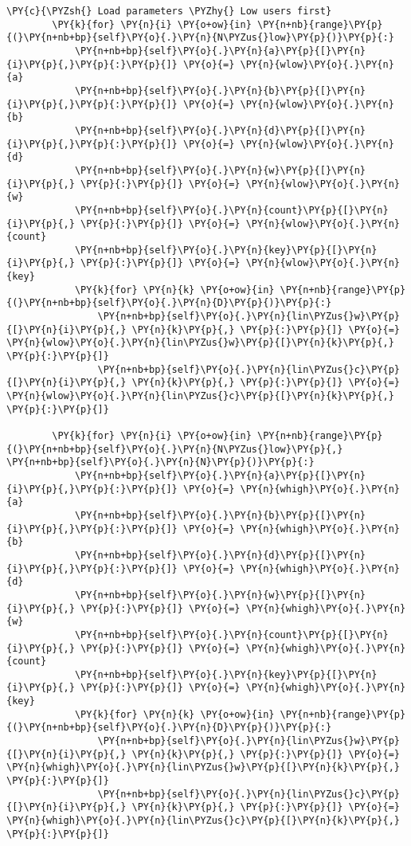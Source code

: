 \begin{Verbatim}[commandchars=\\\{\}]
        \PY{c}{\PYZsh{} Load parameters \PYZhy{} Low users first}
        \PY{k}{for} \PY{n}{i} \PY{o+ow}{in} \PY{n+nb}{range}\PY{p}{(}\PY{n+nb+bp}{self}\PY{o}{.}\PY{n}{N\PYZus{}low}\PY{p}{)}\PY{p}{:}
            \PY{n+nb+bp}{self}\PY{o}{.}\PY{n}{a}\PY{p}{[}\PY{n}{i}\PY{p}{,}\PY{p}{:}\PY{p}{]} \PY{o}{=} \PY{n}{wlow}\PY{o}{.}\PY{n}{a}
            \PY{n+nb+bp}{self}\PY{o}{.}\PY{n}{b}\PY{p}{[}\PY{n}{i}\PY{p}{,}\PY{p}{:}\PY{p}{]} \PY{o}{=} \PY{n}{wlow}\PY{o}{.}\PY{n}{b}
            \PY{n+nb+bp}{self}\PY{o}{.}\PY{n}{d}\PY{p}{[}\PY{n}{i}\PY{p}{,}\PY{p}{:}\PY{p}{]} \PY{o}{=} \PY{n}{wlow}\PY{o}{.}\PY{n}{d}
            \PY{n+nb+bp}{self}\PY{o}{.}\PY{n}{w}\PY{p}{[}\PY{n}{i}\PY{p}{,} \PY{p}{:}\PY{p}{]} \PY{o}{=} \PY{n}{wlow}\PY{o}{.}\PY{n}{w}
            \PY{n+nb+bp}{self}\PY{o}{.}\PY{n}{count}\PY{p}{[}\PY{n}{i}\PY{p}{,} \PY{p}{:}\PY{p}{]} \PY{o}{=} \PY{n}{wlow}\PY{o}{.}\PY{n}{count}
            \PY{n+nb+bp}{self}\PY{o}{.}\PY{n}{key}\PY{p}{[}\PY{n}{i}\PY{p}{,} \PY{p}{:}\PY{p}{]} \PY{o}{=} \PY{n}{wlow}\PY{o}{.}\PY{n}{key}
            \PY{k}{for} \PY{n}{k} \PY{o+ow}{in} \PY{n+nb}{range}\PY{p}{(}\PY{n+nb+bp}{self}\PY{o}{.}\PY{n}{D}\PY{p}{)}\PY{p}{:}
                \PY{n+nb+bp}{self}\PY{o}{.}\PY{n}{lin\PYZus{}w}\PY{p}{[}\PY{n}{i}\PY{p}{,} \PY{n}{k}\PY{p}{,} \PY{p}{:}\PY{p}{]} \PY{o}{=} \PY{n}{wlow}\PY{o}{.}\PY{n}{lin\PYZus{}w}\PY{p}{[}\PY{n}{k}\PY{p}{,} \PY{p}{:}\PY{p}{]}
                \PY{n+nb+bp}{self}\PY{o}{.}\PY{n}{lin\PYZus{}c}\PY{p}{[}\PY{n}{i}\PY{p}{,} \PY{n}{k}\PY{p}{,} \PY{p}{:}\PY{p}{]} \PY{o}{=} \PY{n}{wlow}\PY{o}{.}\PY{n}{lin\PYZus{}c}\PY{p}{[}\PY{n}{k}\PY{p}{,} \PY{p}{:}\PY{p}{]}
        
        \PY{k}{for} \PY{n}{i} \PY{o+ow}{in} \PY{n+nb}{range}\PY{p}{(}\PY{n+nb+bp}{self}\PY{o}{.}\PY{n}{N\PYZus{}low}\PY{p}{,} \PY{n+nb+bp}{self}\PY{o}{.}\PY{n}{N}\PY{p}{)}\PY{p}{:}
            \PY{n+nb+bp}{self}\PY{o}{.}\PY{n}{a}\PY{p}{[}\PY{n}{i}\PY{p}{,}\PY{p}{:}\PY{p}{]} \PY{o}{=} \PY{n}{whigh}\PY{o}{.}\PY{n}{a}
            \PY{n+nb+bp}{self}\PY{o}{.}\PY{n}{b}\PY{p}{[}\PY{n}{i}\PY{p}{,}\PY{p}{:}\PY{p}{]} \PY{o}{=} \PY{n}{whigh}\PY{o}{.}\PY{n}{b}
            \PY{n+nb+bp}{self}\PY{o}{.}\PY{n}{d}\PY{p}{[}\PY{n}{i}\PY{p}{,}\PY{p}{:}\PY{p}{]} \PY{o}{=} \PY{n}{whigh}\PY{o}{.}\PY{n}{d}
            \PY{n+nb+bp}{self}\PY{o}{.}\PY{n}{w}\PY{p}{[}\PY{n}{i}\PY{p}{,} \PY{p}{:}\PY{p}{]} \PY{o}{=} \PY{n}{whigh}\PY{o}{.}\PY{n}{w}
            \PY{n+nb+bp}{self}\PY{o}{.}\PY{n}{count}\PY{p}{[}\PY{n}{i}\PY{p}{,} \PY{p}{:}\PY{p}{]} \PY{o}{=} \PY{n}{whigh}\PY{o}{.}\PY{n}{count}
            \PY{n+nb+bp}{self}\PY{o}{.}\PY{n}{key}\PY{p}{[}\PY{n}{i}\PY{p}{,} \PY{p}{:}\PY{p}{]} \PY{o}{=} \PY{n}{whigh}\PY{o}{.}\PY{n}{key}
            \PY{k}{for} \PY{n}{k} \PY{o+ow}{in} \PY{n+nb}{range}\PY{p}{(}\PY{n+nb+bp}{self}\PY{o}{.}\PY{n}{D}\PY{p}{)}\PY{p}{:}
                \PY{n+nb+bp}{self}\PY{o}{.}\PY{n}{lin\PYZus{}w}\PY{p}{[}\PY{n}{i}\PY{p}{,} \PY{n}{k}\PY{p}{,} \PY{p}{:}\PY{p}{]} \PY{o}{=} \PY{n}{whigh}\PY{o}{.}\PY{n}{lin\PYZus{}w}\PY{p}{[}\PY{n}{k}\PY{p}{,} \PY{p}{:}\PY{p}{]}
                \PY{n+nb+bp}{self}\PY{o}{.}\PY{n}{lin\PYZus{}c}\PY{p}{[}\PY{n}{i}\PY{p}{,} \PY{n}{k}\PY{p}{,} \PY{p}{:}\PY{p}{]} \PY{o}{=} \PY{n}{whigh}\PY{o}{.}\PY{n}{lin\PYZus{}c}\PY{p}{[}\PY{n}{k}\PY{p}{,} \PY{p}{:}\PY{p}{]}
        

\end{Verbatim}
